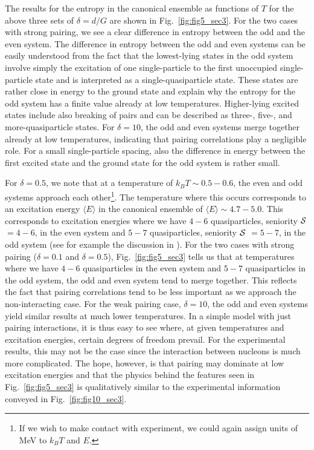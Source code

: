 \documentclass[preprint,rmp,aps,floatfix]{revtex4}
\begin{document}
The results for the entropy in the canonical ensemble 
as functions of $T$ for the above three sets of 
$\delta=d/G$ are shown in Fig.\ \ref{fig:fig5_sec3}. For the two 
cases with strong pairing, we see a clear difference in entropy 
between the odd and the even system. The difference in 
entropy between the odd and even systems can be easily 
understood from the fact that the lowest-lying states in 
the odd system involve simply the excitation of one single-particle 
to the first unoccupied single-particle state and is 
interpreted as a single-quasiparticle state. These states are 
rather close in energy to the ground state and explain 
why the entropy for the odd system has a finite value 
already at low temperatures. Higher-lying excited 
states include also breaking of pairs and can be 
described as three-, five-, and more-quasiparticle states. 
For $\delta=10$, the odd and even systems 
merge together already at low temperatures, indicating that 
pairing correlations play a negligible role. For a small single-particle 
spacing, also the difference in energy between the first 
excited state and the ground state for the odd system is rather small. 


For $\delta=0.5$, we note that at a 
temperature of $k_BT \sim 0.5-0.6$, the even and odd systems
approach each other\footnote{If we wish to make contact with experiment, 
we could again assign units of MeV to $k_BT$ and $E$.}. The 
temperature where this occurs corresponds to an excitation energy 
$\langle E\rangle$ in the canonical ensemble of 
$\langle E\rangle \sim 4.7-5.0$. This corresponds to excitation 
energies where we have $4-6$ quasiparticles, 
seniority ${\cal S}$ $=4-6$, in the even system and 
$5-7$ quasiparticles, seniority ${\cal S}$ $=5-7$, in the odd 
system (see for example the discussion in \cite{entropy2000}).
For the two cases 
with strong pairing ($\delta=0.1$ and $\delta=0.5$), 
Fig.\ \ref{fig:fig5_sec3} tells us that at temperatures where we 
have  $4-6$ quasiparticles in the even system and $5-7$  quasiparticles 
in the odd system, the odd and even system tend to merge 
together. This reflects the fact that pairing correlations tend to be less 
important as we approach the non-interacting case.  
For the weak pairing case, $\delta=10$, the odd and even 
systems yield similar results at much lower temperatures. In a simple 
model with just pairing interactions, it is thus easy to see where, 
at given temperatures and excitation energies, certain degrees 
of freedom prevail. For the experimental results, 
this may not be the case since the interaction between nucleons is 
much more complicated. The hope, however, is that pairing may dominate 
at low excitation energies and that the physics behind the 
features seen 
in Fig.\ \ref{fig:fig5_sec3} is qualitatively similar to 
the experimental information conveyed in  Fig.\ \ref{fig:fig10_sec3}.
\end{document}
